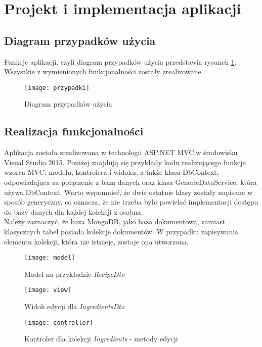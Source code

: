 \section{Projekt i implementacja aplikacji}

\subsection{Diagram przypadków użycia}

Funkcje aplikacji, czyli diagram przypadków użycia przedstawia rysunek \ref{rys:przypadki}. Wszystkie z wymienionych funkcjonalności zostały zrealizowane.

\begin{figure}[H]
	\centering
	\texttt{[image: przypadki]}
	\caption{Diagram przypadków użycia}
	\label{rys:przypadki}
\end{figure}



\subsection{Realizacja funkcjonalności}

Aplikacja została zrealizowana w technologii ASP.NET MVC.w środowisku Visual Studio 2015. Poniżej znajdują się przykłady kodu realizującego funkcje wzorca MVC: modelu, kontrolera i widoku, a także klasa DbContext, odpowiadająca za połączenie z bazą danych oraz klasa GenericDataService, która używa DbContext. Warto wspomnieć, że dwie ostatnie klasy zostały napisane w sposób generyczny, co oznacza, że nie trzeba było powielać implementacji dostępu do bazy danych dla każdej kolekcji z osobna.\\
Należy zaznaczyć, że baza MongoDB, jako baza dokumentowa, zamiast klasycznych tabel posiada kolekcje dokumentów. W przypadku zapisywania elementu kolekcji, która nie istnieje, zostaje ona utworzona.

\begin{figure}[H]
	\centering
	\texttt{[image: model]}
	\caption{Model na przykładzie \textit{RecipeDto}}
	\label{rys:model}
\end{figure}

\begin{figure}[H]
	\centering
	\texttt{[image: view]}
	\caption{Widok edycji dla \textit{IngredientsDto}}
	\label{rys:view}
\end{figure}

\begin{figure}[H]
	\centering
	\texttt{[image: controller]}
	\caption{Kontroler dla kolekcji \textit{Ingredients} - metody edycji}
	\label{rys:controller}
\end{figure}

